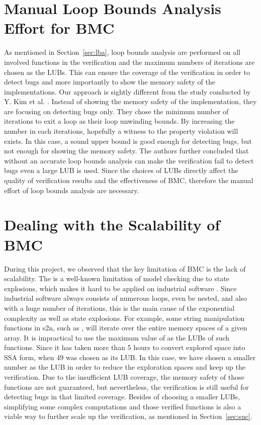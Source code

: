 \section{Manual Loop Bounds Analysis Effort for BMC}
As mentioned in Section~\ref{sec:lba}, loop bounds analysis are performed on all involved functions in the verification and the maximum numbers of iterations are chosen as the LUBs. This can ensure the coverage of the verification in order to detect bugs and more importantly to show the memory safety of the implementations. Our approach is sightly different from the study conducted by Y. Kim et al. \cite{7091291}. Instead of showing the memory safety of the implementation, they are focusing on detecting bugs only. They chose the minimum number of iterations to exit a loop as their loop unwinding bounds. By increasing the number in each iterations, hopefully a witness to the property violation will exists. In this case, a sound upper bound is good enough for detecting bugs, but not enough for showing the memory safety. The authors further concluded that without an accurate loop bounds analysis can make the verification fail to detect bugs even a large LUB is used. Since the choices of LUBs directly affect the quality of verification results and the effectiveness of BMC, therefore the manual effort of loop bounds analysis are necessary.


\section{Dealing with the Scalability of BMC}
During this project, we observed that the key limitation of BMC is the lack of scalability. The is a well-known limitation of model checking due to state explosions, which makes it hard to be applied on industrial software \cite{7091291}. Since industrial software always consists of numerous loops, even be nested, and also with a huge number of iterations, this is the main cause of the exponential complexity as well as state explosions. For example, some string manipulation functions in s2n, such as , will iterate over the entire memory spaces of a given  array. It is impractical to use the maximum value of  as the LUBs of such functions. Since it has taken more than 5 hours to convert explored space into SSA form, when 49 was chosen as its LUB. In this case, we have chosen a smaller number as the LUB in order to reduce the exploration spaces and keep up the verification. Due to the insufficient LUB coverage, the memory safety of those functions are not guaranteed, but nevertheless, the verification is still useful for detecting bugs in that limited coverage. Besides of choosing a smaller LUBs, simplifying some complex computations and those verified functions is also a viable way to further scale up the verification, as mentioned in Section~\ref{sec:suc}.


